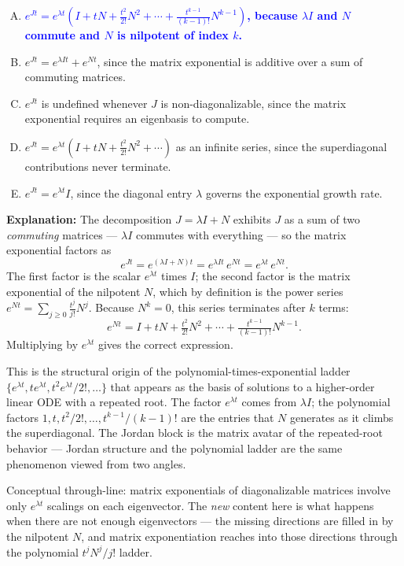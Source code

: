 \documentclass[12pt]{amsart}
\begin{document}
\begin{enumerate}[(A)]
\item \textcolor{blue}{\textbf{$e^{Jt} = e^{\lambda t}\!\left(I + tN + \tfrac{t^2}{2!}N^2 + \cdots + \tfrac{t^{k-1}}{(k-1)!}N^{k-1}\right)$, because $\lambda I$ and $N$ commute and $N$ is nilpotent of index $k$.}}
\item $e^{Jt} = e^{\lambda I t} + e^{Nt}$, since the matrix exponential is additive over a sum of commuting matrices.
\item $e^{Jt}$ is undefined whenever $J$ is non-diagonalizable, since the matrix exponential requires an eigenbasis to compute.
\item $e^{Jt} = e^{\lambda t}\!\left(I + tN + \tfrac{t^2}{2!}N^2 + \cdots\right)$ as an infinite series, since the superdiagonal contributions never terminate.
\item $e^{Jt} = e^{\lambda t} I$, since the diagonal entry $\lambda$ governs the exponential growth rate.
\end{enumerate}

\textbf{Explanation:}
The decomposition $J = \lambda I + N$ exhibits $J$ as a sum of two
\emph{commuting} matrices --- $\lambda I$ commutes with everything --- so
the matrix exponential factors as
$$e^{Jt} = e^{(\lambda I + N) t} = e^{\lambda I t}\, e^{N t} = e^{\lambda t}\, e^{Nt}.$$
The first factor is the scalar $e^{\lambda t}$ times $I$; the second factor
is the matrix exponential of the nilpotent $N$, which by definition is the
power series $e^{Nt} = \sum_{j \geq 0} \frac{t^j}{j!} N^j$. Because
$N^k = 0$, this series terminates after $k$ terms:
$$e^{Nt} = I + tN + \tfrac{t^2}{2!} N^2 + \cdots + \tfrac{t^{k-1}}{(k-1)!} N^{k-1}.$$
Multiplying by $e^{\lambda t}$ gives the correct expression.

This is the structural origin of the polynomial-times-exponential ladder
$\{e^{\lambda t}, t e^{\lambda t}, t^2 e^{\lambda t}/2!, \ldots\}$ that
appears as the basis of solutions to a higher-order linear ODE with a
repeated root. The factor $e^{\lambda t}$ comes from $\lambda I$; the
polynomial factors $1, t, t^2/2!, \ldots, t^{k-1}/(k-1)!$ are the entries
that $N$ generates as it climbs the superdiagonal. The Jordan block is the
matrix avatar of the repeated-root behavior --- Jordan structure and the
polynomial ladder are the same phenomenon viewed from two angles.

Conceptual through-line: matrix exponentials of diagonalizable matrices
involve only $e^{\lambda t}$ scalings on each eigenvector. The \emph{new}
content here is what happens when there are not enough eigenvectors --- the
missing directions are filled in by the nilpotent $N$, and matrix
exponentiation reaches into those directions through the polynomial
$t^j N^j / j!$ ladder.
\end{document}
